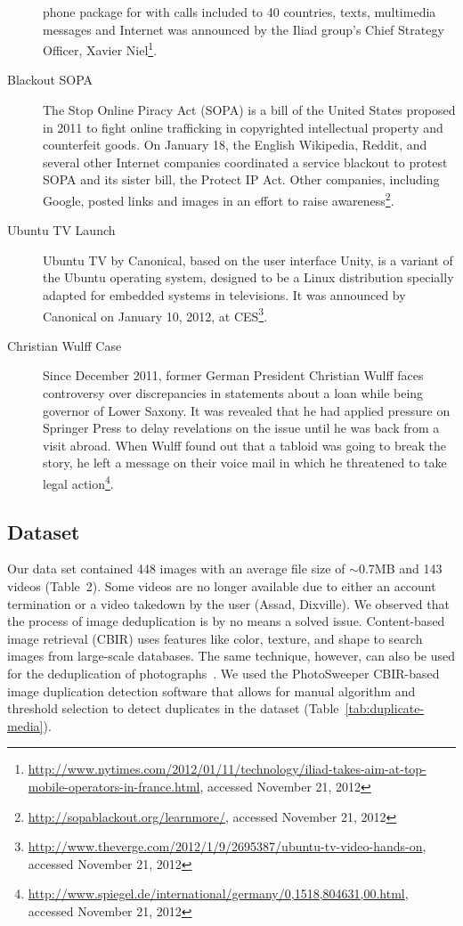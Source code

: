 \begin{description}
       phone package for  with calls included to 40
       countries, texts, multimedia messages and Internet was
       announced by the Iliad group's Chief Strategy Officer,
       Xavier
       Niel\footnote{\url{http://www.nytimes.com/2012/01/11/technology/iliad-takes-aim-at-top-mobile-operators-in-france.html},
       accessed November 21, 2012}.
  \item[Blackout SOPA]
       The Stop Online Piracy Act (SOPA) is a bill of the United
       States proposed in 2011 to fight online trafficking in
       copyrighted intellectual property and counterfeit goods.
       On January 18, the English Wikipedia, Reddit, and several
       other Internet companies coordinated a service blackout
       to protest SOPA and its sister bill, the Protect IP Act.
       Other companies, including Google, posted links and
       images in an effort to raise
       awareness\footnote{\url{http://sopablackout.org/learnmore/},
       accessed November 21, 2012}.
  \item[Ubuntu TV Launch]
       Ubuntu TV by Canonical, based on the user interface Unity,
       is a variant of the Ubuntu operating system, designed to be
       a Linux distribution specially adapted for embedded systems
       in televisions. It was announced by Canonical on January
       10, 2012, at
       CES\footnote{\url{http://www.theverge.com/2012/1/9/2695387/ubuntu-tv-video-hands-on},
       accessed November 21, 2012}.
  \item[Christian Wulff Case]
       Since December 2011, former German President Christian
       Wulff faces controversy over discrepancies in statements
       about a loan while being governor of Lower Saxony.
       It was revealed that he had applied pressure
       on Springer Press to delay revelations on the issue until
       he was back from a visit abroad. When Wulff found out that
       a tabloid was going to break the story, he left a message
       on their voice mail in which he threatened to take legal
       action\footnote{\url{http://www.spiegel.de/international/germany/0,1518,804631,00.html},
       accessed November 21, 2012}.
\end{description}

\subsection{Dataset}
Our data set contained 448 images with an average file size of $\sim$0.7MB and 143 videos (Table~2). Some videos are no longer available due to either an account termination or a video takedown by the user (Assad, Dixville). We observed that the process of image deduplication is by no means a solved issue. Content-based image retrieval (CBIR) uses features like color, texture, and shape to search images from large-scale databases. The same technique, however, can also be used for the deduplication of photographs~\cite{Pattabhi:RAICS11}. We used the PhotoSweeper CBIR-based image duplication detection software that allows for manual algorithm and threshold selection to detect duplicates in the dataset (Table~\ref{tab:duplicate-media}).

